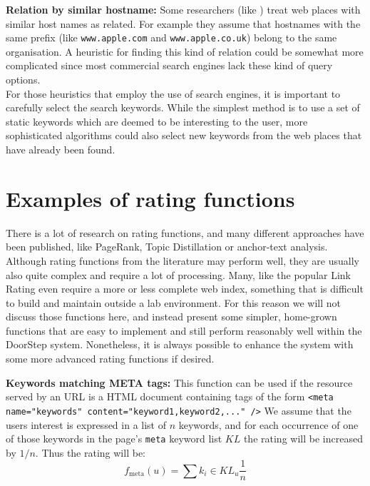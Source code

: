\documentclass[a4paper]{danarticle}
\theoremstyle{remark}
\begin{document}
    \textbf{Relation by similar hostname:} Some researchers (like 
    \cite[Link Affiliation]{experts}) 
    treat web places with similar host names as related. For example they 
    assume that hostnames with the same prefix (like \verb$www.apple.com$ and
    \verb$www.apple.co.uk$) belong to the same organisation. A heuristic for 
    finding this kind of relation could be somewhat more complicated since most 
    commercial search engines lack these kind of query options.
    \\
    
    For those heuristics that employ the use of search engines, it is important 
    to carefully select the search keywords. While the simplest method is to use 
    a set of static keywords which are deemed to be interesting to the user, 
    more sophisticated algorithms could also select new keywords from the web 
    places that have already been found.
  \section{Examples of rating functions}
    There is a lot of research on rating functions, and many different 
    approaches have been published, like PageRank\cite{page}, 
    Topic Distillation\cite{kleinberg} or
    anchor-text analysis\cite{chakrabarti}. 
    Although rating functions from 
    the literature may perform well, they are usually also quite complex and 
    require a lot of processing. Many, like the popular Link 
    Rating\cite{page}\cite{kleinberg}
    even require a more or less complete web index, something that is difficult 
    to build and maintain outside a lab environment. For this reason we will not 
    discuss those functions here, and instead present some simpler, home-grown 
    functions that are easy to implement and still perform reasonably well 
    within the DoorStep system. Nonetheless, it is always possible to enhance 
    the system with some more advanced rating functions if desired.
  
    \textbf{Keywords matching META tags:} This function can be used if the
    resource served by an URL is a HTML document containing tags of the form
    \verb$<meta name="keywords" content="keyword1,keyword2,..." />$ 
    We assume that the users interest is expressed in a list of $ n $ keywords,
    and for each occurrence of one of those keywords in the page's \verb$meta$
    keyword list $ KL $ the rating will be increased by $ 1/n $. Thus
    the rating will be:
    \[
      f_{\mbox{meta}}(u) = \sum{k_i \in KL_u} \frac{1}{n}
    \]
    \\
    
\end{document}
